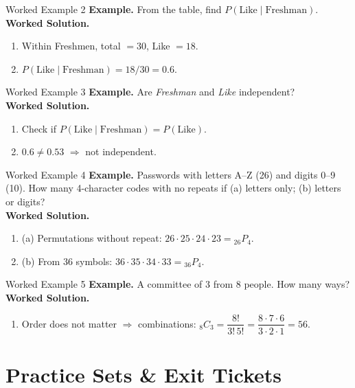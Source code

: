 \documentclass[aspectratio=169]{beamer}
\newcommand{\exampletitle}[1]{\vspace{0.25em}\textbf{Example.} #1\vspace{0.25em}}
\newcommand{\worked}{\textbf{Worked Solution.}}
\begin{document}
\begin{frame}{Worked Example 2}
\exampletitle{From the table, find $P(\text{Like}\mid \text{Freshman})$.}\\[0.25em]
\worked
\begin{enumerate}
  \item Within Freshmen, total $=30$, Like $=18$.
  \item $P(\text{Like}\mid \text{Freshman})=18/30=0.6$.
\end{enumerate}
\end{frame}

\begin{frame}{Worked Example 3}
\exampletitle{Are \textit{Freshman} and \textit{Like} independent?}\\[0.25em]
\worked
\begin{enumerate}
  \item Check if $P(\text{Like}\mid \text{Freshman})=P(\text{Like})$.
  \item $0.6 \neq 0.53$ $\Rightarrow$ not independent.
\end{enumerate}
\end{frame}

\begin{frame}{Worked Example 4}
\exampletitle{Passwords with letters A--Z (26) and digits 0--9 (10). How many 4-character codes with no repeats if (a) letters only; (b) letters or digits?}\\[0.25em]
\worked
\begin{enumerate}
  \item (a) Permutations without repeat: $26\cdot25\cdot24\cdot23={}_ {26}P_4$.
  \item (b) From 36 symbols: $36\cdot35\cdot34\cdot33={}_{36}P_4$.
\end{enumerate}
\end{frame}

\begin{frame}{Worked Example 5}
\exampletitle{A committee of 3 from 8 people. How many ways?}\\[0.25em]
\worked
\begin{enumerate}
  \item Order does not matter $\Rightarrow$ combinations: $_8C_3=\dfrac{8!}{3!\,5!}=\dfrac{8\cdot7\cdot6}{3\cdot2\cdot1}=56$.
\end{enumerate}
\end{frame}

\section{Practice Sets \& Exit Tickets}
\end{document}
